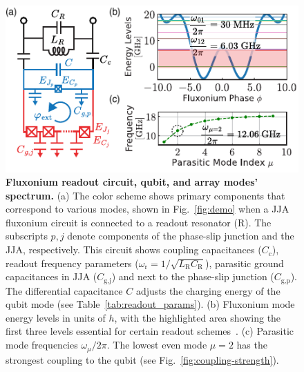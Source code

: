 \documentclass[%
reprint,
superscriptaddress,
 amsmath,amssymb,
 aps,
 prx,
longbibliography,
floatfix,
]{revtex4-2}
\begin{document}
\begin{figure}[t]
\centering    
\includegraphics[width=\linewidth]{Figures/Meas_Circuit.pdf}
\caption{{\bf Fluxonium readout circuit, qubit, and array modes' spectrum.} (a) The color scheme shows primary components that correspond to various modes, shown in Fig.~\ref{fig:demo} when a JJA fluxonium circuit is connected to a readout resonator (R). The subscripts $p,j$ denote components of the phase-slip junction and the JJA, respectively. This circuit shows coupling capacitances ($C_\textrm{c}$), readout frequency parameters ($\omega_\textrm{r}=1/\sqrt{L_\textrm{R}C_\textrm{R}}$), parasitic ground capacitances in JJA ($C_\textrm{g,j}$) and next to the phase-slip junction ($C_\textrm{g,p}$). The differential capacitance $C$ adjusts the charging energy of the qubit mode (see Table~\ref{tab:readout_params}). (b) Fluxonium mode energy levels in units of $h$, with the highlighted area showing the first three levels essential for certain readout schemes~\cite{zhang_universal_2021}. (c) Parasitic mode frequencies $\omega_\mu/2\pi$. The lowest even mode $\mu = 2$ has the strongest coupling to the qubit (see Fig.~\ref{fig:coupling-strength}).
}
\label{fig:meas_circuit}
\end{figure}
\end{document}
